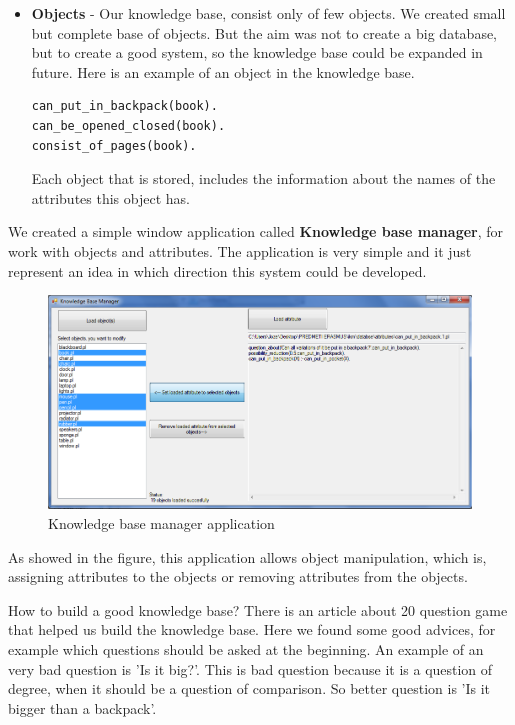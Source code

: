 \documentclass[a4paper]{article}
\begin{document}
\begin{itemize}
\item \textbf{Objects} - Our knowledge base, consist only of few objects. We created small but complete base of objects. But the aim was not to create a big database, but to create a good system, so the knowledge base could be expanded in future. Here is an example of an object in the knowledge base.
\begin{lstlisting}[caption=Object book.pl,label=lst:objectexample]
can_put_in_backpack(book).
can_be_opened_closed(book).
consist_of_pages(book).
\end{lstlisting}
Each object that is stored, includes the information about the names of the attributes this object has.
\end{itemize}

We created a simple window application called \textbf{Knowledge base manager}, for work with objects and attributes. The application is very simple and it just represent an idea in which direction this system could be developed.

    \begin{figure}[h]
      \begin{center}
		\includegraphics[scale=0.55]{img/KnowledgeBaseManagerPicture.png}	
\caption{Knowledge base manager application
\label{fig:SearchOptions}}
      \end{center}
    \end{figure}
    
As showed in the figure, this application allows object manipulation, which is, assigning attributes to the objects or removing attributes from the objects.


How to build a good knowledge base? There is an article about 20 question game \citet{howToAskQuestions} that helped us build the knowledge base. Here we found some good advices, for example which questions should be asked at the beginning. An example of an very bad question is 'Is it big?'. This is bad question because it is a question of degree, when it should be a question of comparison. So better question is 'Is it bigger than a backpack'.
\end{document}
